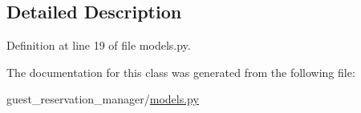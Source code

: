 \subsection{Detailed Description}


Definition at line 19 of file models.\-py.



The documentation for this class was generated from the following file\-:\begin{DoxyCompactItemize}
\item 
guest\-\_\-reservation\-\_\-manager/\hyperlink{guest__reservation__manager_2models_8py}{models.\-py}\end{DoxyCompactItemize}
